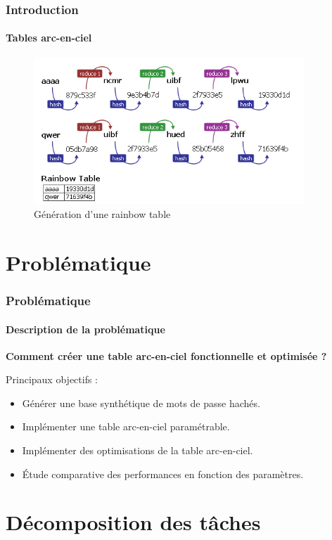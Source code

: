 \documentclass{beamer}
\begin{document}
\begin{frame}
\frametitle{Introduction}
\framesubtitle {Tables arc-en-ciel}
\begin{center}
\end{center}
\begin{figure}[H]
\centering
\includegraphics[height=5.5cm]{img/fonctionnement.png}
\caption{Génération d’une rainbow table}
\end{figure}
\end{frame}

\section{Problématique}
\begin{frame}
\frametitle{Problématique}
\framesubtitle {Description de la problématique }
\begin{center}
    \textbf{Comment créer une table arc-en-ciel fonctionnelle et optimisée ?}
\end{center}
\begin{block}{Principaux objectifs :}
\begin{itemize}
\item Générer une base synthétique de mots de passe hachés.
\item Implémenter une table arc-en-ciel paramétrable.
\item Implémenter des optimisations de la table arc-en-ciel.
\item Étude comparative des performances en fonction des paramètres.
\end{itemize} 
\end{block}
\end{frame}

\section{Décomposition des tâches}
\end{document}
